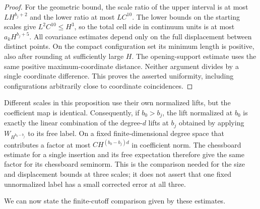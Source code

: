 \begin{proof}
For the geometric bound, the scale ratio of the upper interval is at most
$L H^{b_j+2}$ and the lower ratio at most $L C^{10}$.
The lower bounds on the starting scales give $L^2C^{10}\le H^3$, so the total
cell side in continuum units is at most $a_kH^{b_j+5}$.
All covariance estimates depend only on the full displacement
between distinct points. On the compact configuration set its minimum
length is positive, also after rounding at sufficiently large
$H$. The opening-support estimate uses the same positive
maximum-coordinate distance. Neither argument divides by a
single coordinate difference. This proves the asserted
uniformity, including configurations arbitrarily close to
coordinate coincidences.
\end{proof}

Different scales in this proposition use their own normalized
lifts, but the coefficient map is identical. Consequently, if
$b_0>b_j$, the lift normalized at $b_0$ is exactly the linear
combination of the degree-$d$ lifts at $b_j$ obtained by
applying $W_{H^{b_0-b_j}}$ to its free label.
On a fixed finite-dimensional degree space that contributes a factor at most
$C H^{(b_0-b_j)d}$ in coefficient norm.
The chessboard estimate for a single insertion and its free expectation therefore
give the same factor for its chessboard seminorm.
This is the comparison needed for the size and displacement
bounds at three scales; it does not assert that one fixed
unnormalized label has a small corrected error at all three.


We can now state the finite-cutoff comparison given by these estimates.

